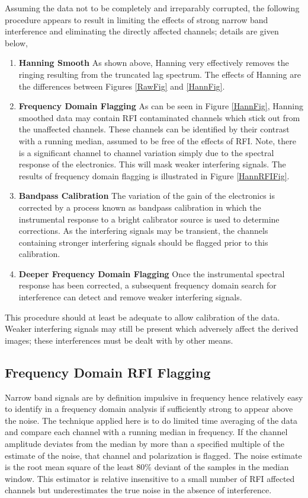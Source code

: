 \documentclass[journal]{IEEEtran}
\begin{document}
Assuming the data not to be completely and irreparably corrupted, the
following procedure appears to result in limiting the effects of
strong narrow band interference and eliminating the directly affected
channels; details are given below,
\begin{enumerate}
\item {\bf Hanning Smooth}
As shown above, Hanning very effectively removes the ringing resulting
from the truncated lag spectrum.
The effects of Hanning are the differences between Figures \ref{RawFig} and
\ref{HannFig}. 
\item {\bf Frequency Domain Flagging}
As can be seen in Figure \ref{HannFig}, Hanning smoothed data may contain
RFI contaminated channels which stick out from the unaffected
channels.
These channels can be identified by their contrast with a running
median, assumed to be free of the effects of RFI.
Note, there is a significant channel to channel variation simply due
to the spectral response of the electronics.
This will mask weaker interfering signals.
The results of frequency domain flagging is illustrated in Figure
\ref{HannRFIFig}. 
\item {\bf Bandpass Calibration}
The variation of the gain of the electronics is corrected by a process
known as bandpass calibration in which the instrumental response to a
bright calibrator source is used to determine corrections.
As the interfering signals may be transient, the channels containing
stronger interfering signals should be flagged prior to this calibration.
\item {\bf Deeper Frequency Domain Flagging}
Once the instrumental spectral response has been corrected, a
subsequent frequency domain search for interference can detect and
remove weaker interfering signals.
\end{enumerate}
This procedure should at least be adequate to allow calibration of the
data.
Weaker interfering signals may still be present which adversely affect
the derived images;  these interferences must be dealt with by other
means. 

\subsection{Frequency Domain RFI Flagging}
Narrow band signals are by definition impulsive in frequency hence
relatively easy to identify in a frequency domain analysis if
sufficiently strong to appear above the noise.
The technique applied here is to do limited time averaging of the
data and compare each channel with a running median in frequency.
If the channel amplitude deviates from the median by more than a
specified multiple of the estimate of the noise, that channel and
polarization is flagged.
The noise estimate is the root mean square of the least 80\% deviant of
the samples in the median window.
This estimator is relative insensitive to a small number of RFI
affected channels but underestimates the true noise in the absence of
interference.
\end{document}
